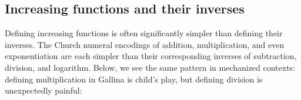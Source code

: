

\subsection{Increasing functions and their inverses}
Defining increasing functions is often significantly simpler than defining their inverses.
The Church numeral encodings of addition, multiplication, and even exponentiation
are each simpler than their corresponding inverses of subtraction, division, and logarithm. Below, we see the same pattern in mechanized contexts: defining multiplication in Gallina is
child's play, but defining division is unexpectedly painful:

